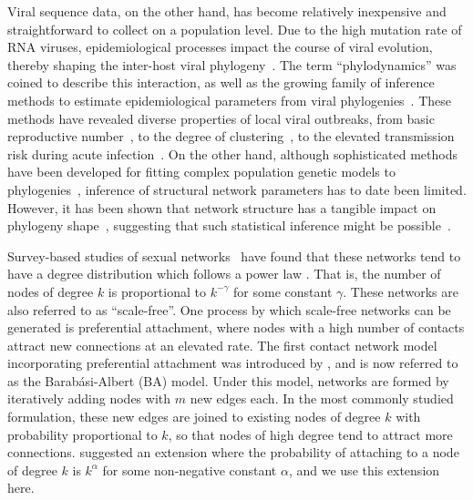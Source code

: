 \documentclass[nogrid]{MBE}
\begin{document}
Viral sequence data, on the other hand, has become relatively inexpensive and
straightforward to collect on a population level. Due to the high mutation rate
of RNA viruses, epidemiological processes impact the course of viral evolution,
thereby shaping the inter-host viral
phylogeny~\citep{drummond2003measurably}. The term ``phylodynamics'' was
coined to describe this interaction, as well as the growing family of inference
methods to estimate epidemiological parameters from viral
phylogenies~\citep{grenfell2004unifying}. These methods have revealed
diverse properties of local viral outbreaks, from basic reproductive
number~\citep{stadler2012estimating}, to the degree of
clustering~\citep{hughes2009molecular}, to the elevated transmission risk
during acute infection~\citep{volz2012simple}. On the other hand, although
sophisticated methods have been developed for fitting complex population
genetic models to phylogenies~\citep{rasmussen2014phylodynamic}, inference
of structural network parameters has to date been limited. However, it has been
shown that network structure has a tangible impact on phylogeny
shape~\citep{leventhal2012inferring, colijn2014phylogenetic,
goodreau2006assessing, robinson2013dynamics, villandre2016assessment},
suggesting that such statistical inference might be
possible~\citep{welch2011statistical}.

Survey-based studies of sexual networks~\citep{liljeros2001web,
schneeberger2004scale, colgate1989risk} have found that these networks tend to
have a degree distribution which follows a power law \citep[although there has
been some disagreement, see][]{handcock2004likelihood}. That is, the number of
nodes of degree $k$ is proportional to $k^{-\gamma}$ for some constant
$\gamma$. These networks are also referred to as ``scale-free''. One process by
which scale-free networks can be generated is preferential attachment, where
nodes with a high number of contacts attract new connections at an elevated
rate. The first contact network model incorporating preferential attachment was
introduced by \citet{barabasi1999emergence}, and is now referred to as the
Barab\'asi-Albert (BA) model. Under this model, networks are formed by
iteratively adding nodes with $m$ new edges each. In the most commonly studied
formulation, these new edges are joined to existing nodes of degree $k$ with
probability proportional to $k$, so that nodes of high degree tend to attract
more connections. \citeauthor{barabasi1999emergence} suggested an extension
where the probability of attaching to a node of degree $k$ is $k^\alpha$ for
some non-negative constant $\alpha$, and we use this extension here.
\end{document}
